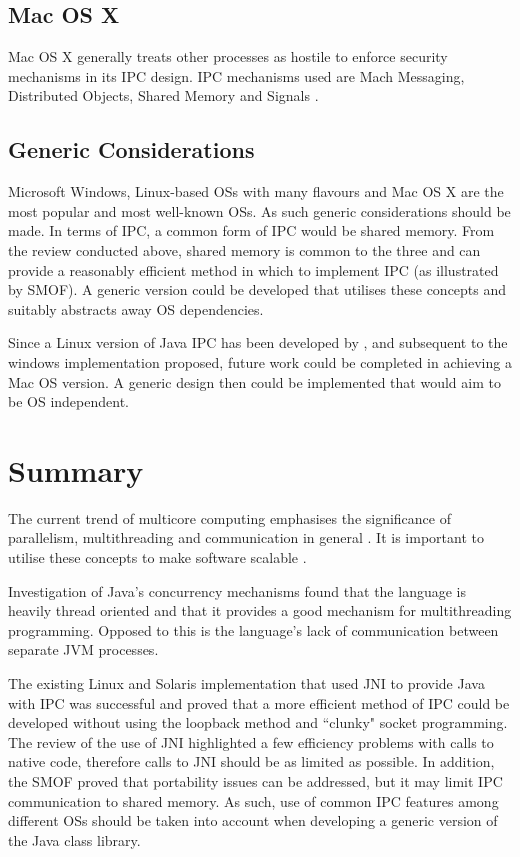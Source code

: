 \documentclass[12pt,a4paper,oneside]{article}
\begin{document}
  \subsection{Mac OS X}
    Mac OS X generally treats other processes as hostile to enforce security mechanisms in its IPC design. IPC mechanisms used are Mach Messaging, Distributed Objects, Shared Memory and Signals \citep{MAC_API}.

    \subsection{Generic Considerations}
      Microsoft Windows, Linux-based OSs with many flavours and Mac OS X are the most popular and most well-known OSs. As such generic considerations should be made. In terms of IPC, a common form of IPC would be shared memory. From the review conducted above, shared memory is common to the three and can provide a reasonably efficient method in which to implement IPC (as illustrated by SMOF). A generic version could be developed that utilises these concepts and suitably abstracts away OS dependencies.

      Since a Linux version of Java IPC has been developed by \cite{WellsIPCJava}, and subsequent to the windows implementation proposed, future work could be completed
      in achieving a Mac OS version. A generic design then could be implemented that
      would aim to be OS independent.  

  \section{Summary}

    The current trend of multicore computing emphasises the significance of parallelism, multithreading and communication in general \citep{taboada2013javaforHPC}. It is important to utilise these concepts to make software scalable \citep{SlinnJVMAkka}.

    Investigation of Java's concurrency mechanisms found that the language is heavily thread oriented and that it provides a good mechanism for multithreading programming. Opposed to this is the language's lack of communication between separate JVM processes.

    The existing Linux and Solaris implementation that used JNI to provide Java with IPC was successful and proved that a more efficient method of IPC could be developed without using the loopback method and ``clunky" socket programming. The review of the use of JNI highlighted a few efficiency problems with calls to native code, therefore calls to JNI should be as limited as possible. In addition, the SMOF proved that portability issues can be addressed, but it may limit IPC communication to shared memory. As such, use of common IPC features among different OSs should be taken into account when developing a generic version of the Java class library.
\end{document}
